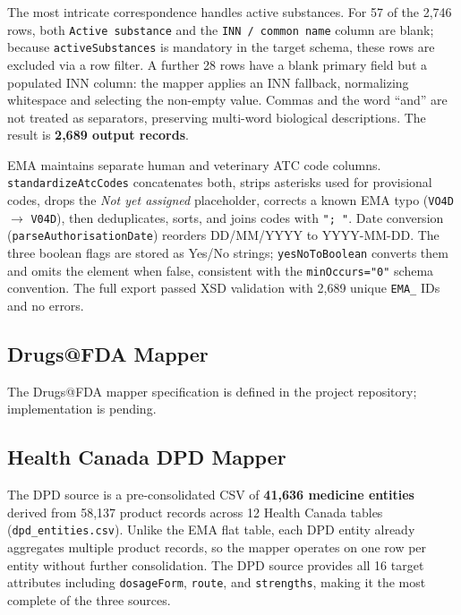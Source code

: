 \documentclass[a4paper,oneside,bibliography=totoc]{scrbook}
\begin{document}
The most intricate correspondence handles active substances. For 57 of
the 2,746 rows, both \texttt{Active substance} and the \texttt{INN /
common name} column are blank; because \texttt{activeSubstances} is
mandatory in the target schema, these rows are excluded via a row filter.
A further 28 rows have a blank primary field but a populated INN column:
the mapper applies an INN fallback, normalizing whitespace and selecting
the non-empty value. Commas and the word ``and'' are not treated as
separators, preserving multi-word biological descriptions. The result is
\textbf{2,689 output records}.

EMA maintains separate human and veterinary ATC code columns.
\texttt{standardizeAtcCodes} concatenates both, strips asterisks used
for provisional codes, drops the \textit{Not yet assigned} placeholder,
corrects a known EMA typo (\texttt{VO4D} $\rightarrow$ \texttt{V04D}),
then deduplicates, sorts, and joins codes with \texttt{"; "}. Date
conversion (\texttt{parseAuthorisationDate}) reorders DD/MM/YYYY to
YYYY-MM-DD. The three boolean flags are stored as Yes/No strings;
\texttt{yesNoToBoolean} converts them and omits the element when false,
consistent with the \texttt{minOccurs="0"} schema convention. The full
export passed XSD validation with 2,689 unique \texttt{EMA\_} IDs and no
errors.

\subsection{Drugs@FDA Mapper}

The Drugs@FDA mapper specification is defined in the project repository;
implementation is pending.

\subsection{Health Canada DPD Mapper}

The DPD source is a pre-consolidated CSV of \textbf{41,636 medicine
entities} derived from 58,137 product records across 12 Health Canada
tables (\texttt{dpd\_entities.csv}). Unlike the EMA flat table, each DPD
entity already aggregates multiple product records, so the mapper
operates on one row per entity without further consolidation. The DPD
source provides all 16 target attributes including \texttt{dosageForm},
\texttt{route}, and \texttt{strengths}, making it the most complete of
the three sources.
\end{document}

